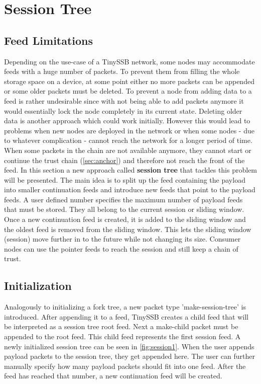 \section{Session Tree}
\label{sec:session}
\subsection{Feed Limitations}
\label{sec:sessionlimit}
Depending on the use-case of a TinySSB network, some nodes may accommodate feeds with a huge number of packets. To prevent them from filling the whole storage space on a device, at some point either no more packets can be appended or some older packets must be deleted. To prevent a node from adding data to a feed is rather undesirable since with not being able to add packets anymore it would essentially lock the node completely in its current state. Deleting older data is another approach which could work initially. However this would lead to problems when new nodes are deployed in the network or when some nodes - due to whatever complication - cannot reach the network for a longer period of time. When some packets in the chain are not available anymore, they cannot start or continue the trust chain (\cref{sec:anchor}) and therefore not reach the front of the feed. In this section a new approach called \textbf{session tree} that tackles this problem will be presented. The main idea is to split up the feed containing the payload into smaller continuation feeds and introduce new feeds that point to the payload feeds. A user defined number specifies the maximum number of payload feeds that must be stored. They all belong to the current session or sliding window. Once a new continuation feed is created, it is added to the sliding window and the oldest feed is removed from the sliding window. This lets the sliding window (session) move further in to the future while not changing its size. Consumer nodes can use the pointer feeds to reach the session and still keep a chain of trust.

\subsection{Initialization}
Analogously to initializing a fork tree, a new packet type 'make-session-tree' is introduced. After appending it to a feed, TinySSB creates a child feed that will be interpreted as a session tree root feed. Next a make-child packet must be appended to the root feed. This child feed represents the first session feed. A newly initialized session tree can be seen in \cref{fig:session1}. When the user appends payload packets to the session tree, they get appended here. The user can further manually specify how many payload packets should fit into one feed. After the feed has reached that number, a new continuation feed will be created. 

